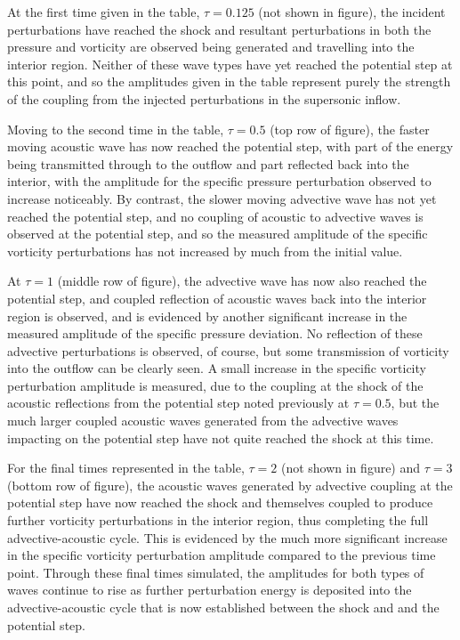 At the first time given in the table, $\tau=0.125$ (not shown in figure), the incident perturbations have reached the shock and resultant perturbations in both the pressure and vorticity are observed being generated and travelling into the interior region. Neither of these wave types have yet reached the potential step at this point, and so the amplitudes given in the table represent purely the strength of the coupling from the injected perturbations in the supersonic inflow.

Moving to the second time in the table, $\tau=0.5$ (top row of figure), the faster moving acoustic wave has now reached the potential step, with part of the energy being transmitted through to the outflow and part reflected back into the interior, with the amplitude for the specific pressure perturbation observed to increase noticeably. By contrast, the slower moving advective wave has not yet reached the potential step, and no coupling of acoustic to advective waves is observed at the potential step, and so the measured amplitude of the specific vorticity perturbations has not increased by much from the initial value.

At $\tau=1$ (middle row of figure), the advective wave has now also reached the potential step, and coupled reflection of acoustic waves back into the interior region is observed, and is evidenced by another significant increase in the measured amplitude of the specific pressure deviation. No reflection of these advective perturbations is observed, of course, but some transmission of vorticity into the outflow can be clearly seen. A small increase in the specific vorticity perturbation amplitude is measured, due to the coupling at the shock of the acoustic reflections from the potential step noted previously at $\tau=0.5$, but the much larger coupled acoustic waves generated from the advective waves impacting on the potential step have not quite reached the shock at this time.

For the final times represented in the table, $\tau=2$ (not shown in figure) and $\tau=3$ (bottom row of figure), the acoustic waves generated by advective coupling at the potential step have now reached the shock and themselves coupled to produce further vorticity perturbations in the interior region, thus completing the full advective-acoustic cycle. This is evidenced by the much more significant increase in the specific vorticity perturbation amplitude compared to the previous time point. Through these final times simulated, the amplitudes for both types of waves continue to rise as further perturbation energy is deposited into the advective-acoustic cycle that is now established between the shock and and the potential step.